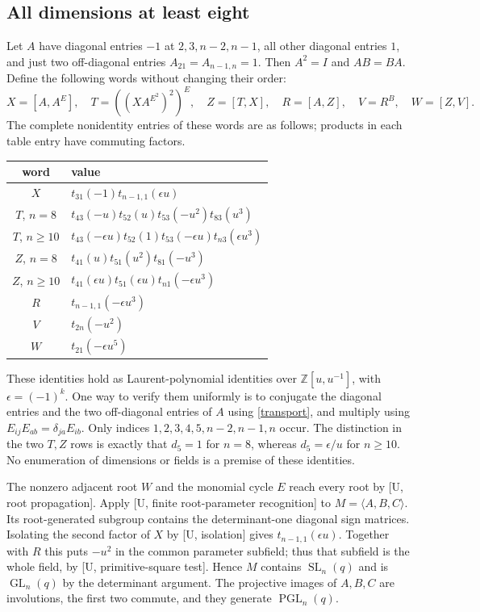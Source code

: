 \documentclass[11pt]{article}
\newcommand{\GL}{\operatorname{GL}}\newcommand{\SL}{\operatorname{SL}}
\newcommand{\PGL}{\operatorname{PGL}}\newcommand{\PSL}{\operatorname{PSL}}
\begin{document}
\subsection{All dimensions at least eight}
Let $A$ have diagonal entries $-1$ at $2,3,n-2,n-1$, all other diagonal
entries $1$, and just two off-diagonal entries
$A_{21}=A_{n-1,n}=1$. Then $A^2=I$ and $AB=BA$.
Define the following words without changing their order:
\[
 X=[A,A^E],\quad T=((XA^{E^2})^2)^E,\quad Z=[T,X],\quad
 R=[A,Z],\quad V=R^B,\quad W=[Z,V].
\]
The complete nonidentity entries of these words are as follows; products
in each table entry have commuting factors.
\begin{center}\small
\begin{tabular}{c|l}
word&value\\\hline
$X$&$t_{31}(-1)t_{n-1,1}(\epsilon u)$\\
$T$, $n=8$&$t_{43}(-u)t_{52}(u)t_{53}(-u^2)t_{83}(u^3)$\\
$T$, $n\geq10$&$t_{43}(-\epsilon u)t_{52}(1)t_{53}(-\epsilon u)t_{n3}(\epsilon u^3)$\\
$Z$, $n=8$&$t_{41}(u)t_{51}(u^2)t_{81}(-u^3)$\\
$Z$, $n\geq10$&$t_{41}(\epsilon u)t_{51}(\epsilon u)t_{n1}(-\epsilon u^3)$\\
$R$&$t_{n-1,1}(-\epsilon u^3)$\\
$V$&$t_{2n}(-u^2)$\\
$W$&$t_{21}(-\epsilon u^5)$
\end{tabular}
\end{center}
These identities hold as Laurent-polynomial identities over
$\mathbb Z[u,u^{-1}]$, with $\epsilon=(-1)^k$. One way to verify them
uniformly is to conjugate the diagonal entries and the two off-diagonal
entries of $A$ using \eqref{transport}, and multiply using
$E_{ij}E_{ab}=\delta_{ja}E_{ib}$. Only indices
$1,2,3,4,5,n-2,n-1,n$ occur. The distinction in the two $T,Z$ rows is
exactly that $d_5=1$ for $n=8$, whereas $d_5=\epsilon/u$ for $n\geq10$.
No enumeration of dimensions or fields is a premise of these identities.

The nonzero adjacent root $W$ and the monomial cycle $E$ reach every
root by [U, root propagation]. Apply [U, finite root-parameter recognition]
to $M=\langle A,B,C\rangle$. Its root-generated subgroup contains the
determinant-one diagonal sign matrices. Isolating the second factor of
$X$ by [U, isolation] gives $t_{n-1,1}(\epsilon u)$. Together with $R$
this puts $-u^2$ in the common parameter subfield; thus that subfield is
the whole field, by [U, primitive-square test]. Hence $M$ contains
$\SL_n(q)$ and is $\GL_n(q)$ by the determinant argument. The projective
images of $A,B,C$ are involutions, the first two commute, and they
generate $\PGL_n(q)$.
\end{document}
